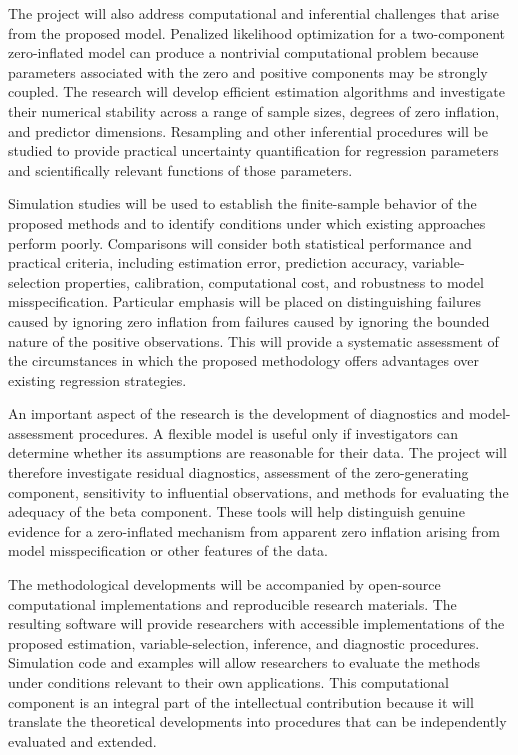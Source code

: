 \documentclass[
  11pt,
  letterpaper,
]{article}
\begin{document}
The project will also address computational and inferential challenges
that arise from the proposed model. Penalized likelihood optimization
for a two-component zero-inflated model can produce a nontrivial
computational problem because parameters associated with the zero and
positive components may be strongly coupled. The research will develop
efficient estimation algorithms and investigate their numerical
stability across a range of sample sizes, degrees of zero inflation, and
predictor dimensions. Resampling and other inferential procedures will
be studied to provide practical uncertainty quantification for
regression parameters and scientifically relevant functions of those
parameters.

Simulation studies will be used to establish the finite-sample behavior
of the proposed methods and to identify conditions under which existing
approaches perform poorly. Comparisons will consider both statistical
performance and practical criteria, including estimation error,
prediction accuracy, variable-selection properties, calibration,
computational cost, and robustness to model misspecification. Particular
emphasis will be placed on distinguishing failures caused by ignoring
zero inflation from failures caused by ignoring the bounded nature of
the positive observations. This will provide a systematic assessment of
the circumstances in which the proposed methodology offers advantages
over existing regression strategies.

An important aspect of the research is the development of diagnostics
and model-assessment procedures. A flexible model is useful only if
investigators can determine whether its assumptions are reasonable for
their data. The project will therefore investigate residual diagnostics,
assessment of the zero-generating component, sensitivity to influential
observations, and methods for evaluating the adequacy of the beta
component. These tools will help distinguish genuine evidence for a
zero-inflated mechanism from apparent zero inflation arising from model
misspecification or other features of the data.

The methodological developments will be accompanied by open-source
computational implementations and reproducible research materials. The
resulting software will provide researchers with accessible
implementations of the proposed estimation, variable-selection,
inference, and diagnostic procedures. Simulation code and examples will
allow researchers to evaluate the methods under conditions relevant to
their own applications. This computational component is an integral part
of the intellectual contribution because it will translate the
theoretical developments into procedures that can be independently
evaluated and extended.
\end{document}
